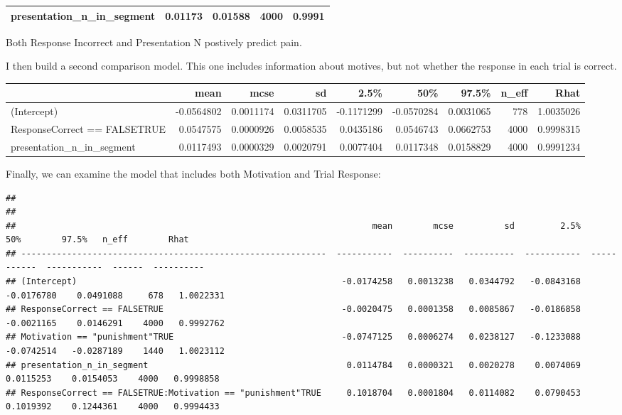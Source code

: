\documentclass[]{article}
\begin{document}
\begin{longtable}[]{@{}ccccc@{}}
\begin{minipage}[t]{0.38\columnwidth}\centering\strut
\textbf{presentation\_n\_in\_segment}\strut
\end{minipage} & \begin{minipage}[t]{0.13\columnwidth}\centering\strut
0.01173\strut
\end{minipage} & \begin{minipage}[t]{0.13\columnwidth}\centering\strut
0.01588\strut
\end{minipage} & \begin{minipage}[t]{0.10\columnwidth}\centering\strut
4000\strut
\end{minipage} & \begin{minipage}[t]{0.10\columnwidth}\centering\strut
0.9991\strut
\end{minipage}\tabularnewline
\bottomrule
\end{longtable}

Both Response Incorrect and Presentation N postively predict pain.

I then build a second comparison model. This one includes information
about motives, but not whether the response in each trial is correct.

\begin{longtable}[]{@{}lrrrrrrrr@{}}
\toprule
& mean & mcse & sd & 2.5\% & 50\% & 97.5\% & n\_eff &
Rhat\tabularnewline
\midrule
\endhead
(Intercept) & -0.0564802 & 0.0011174 & 0.0311705 & -0.1171299 &
-0.0570284 & 0.0031065 & 778 & 1.0035026\tabularnewline
ResponseCorrect == FALSETRUE & 0.0547575 & 0.0000926 & 0.0058535 &
0.0435186 & 0.0546743 & 0.0662753 & 4000 & 0.9998315\tabularnewline
presentation\_n\_in\_segment & 0.0117493 & 0.0000329 & 0.0020791 &
0.0077404 & 0.0117348 & 0.0158829 & 4000 & 0.9991234\tabularnewline
\bottomrule
\end{longtable}

Finally, we can examine the model that includes both Motivation and
Trial Response:

\begin{verbatim}
## 
## 
##                                                                      mean        mcse          sd         2.5%          50%        97.5%   n_eff        Rhat
## ------------------------------------------------------------  -----------  ----------  ----------  -----------  -----------  -----------  ------  ----------
## (Intercept)                                                    -0.0174258   0.0013238   0.0344792   -0.0843168   -0.0176780    0.0491088     678   1.0022331
## ResponseCorrect == FALSETRUE                                   -0.0020475   0.0001358   0.0085867   -0.0186858   -0.0021165    0.0146291    4000   0.9992762
## Motivation == "punishment"TRUE                                 -0.0747125   0.0006274   0.0238127   -0.1233088   -0.0742514   -0.0287189    1440   1.0023112
## presentation_n_in_segment                                       0.0114784   0.0000321   0.0020278    0.0074069    0.0115253    0.0154053    4000   0.9998858
## ResponseCorrect == FALSETRUE:Motivation == "punishment"TRUE     0.1018704   0.0001804   0.0114082    0.0790453    0.1019392    0.1244361    4000   0.9994433
\end{verbatim}
\end{document}
